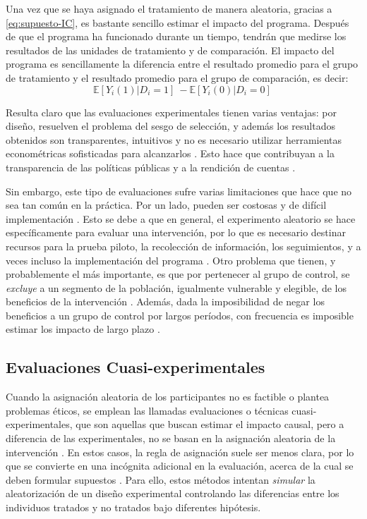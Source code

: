 \documentclass[../../main.tex]{subfiles}
\begin{document}
Una vez que se haya asignado el tratamiento de manera aleatoria, gracias a
\ref{eq:supuesto-IC}, es bastante sencillo estimar el impacto del programa. Después de que
el programa ha funcionado durante un tiempo, tendrán que medirse los resultados de las
unidades de tratamiento y de comparación. El impacto del programa es sencillamente la
diferencia entre el resultado promedio para el grupo de tratamiento y el resultado
promedio para el grupo de comparación, es decir:
\[
\mathbb{E} \left[Y_i(1)|D_i=1\right]\ - \mathbb{E} \left[Y_i(0)|D_i=0\right]\
\]

Resulta claro que las evaluaciones experimentales tienen varias ventajas: por diseño,
resuelven el problema del sesgo de selección, y además los resultados obtenidos son
transparentes, intuitivos y no es necesario utilizar herramientas econométricas
sofisticadas para alcanzarlos \cite{bernal}. Esto hace que contribuyan a la transparencia
de las políticas públicas y a la rendición de cuentas \cite{bernal}.

Sin embargo, este tipo de evaluaciones sufre varias limitaciones que hace que no sea tan
común en la práctica. Por un lado, pueden ser costosas y de difícil implementación
\cite{bernal}. Esto se debe a que en general, el experimento aleatorio se hace
específicamente para evaluar una intervención, por lo que es necesario destinar recursos
para la prueba piloto, la recolección de información, los seguimientos, y a veces incluso
la implementación del programa \cite{bernal}. Otro problema que tienen, y probablemente el
más importante, es que por pertenecer al grupo de control, se \textit{excluye} a un
segmento de la población, igualmente vulnerable y elegible, de los beneficios de la
intervención \cite{bernal}. Además, dada la imposibilidad de negar los beneficios a un
grupo de control por largos períodos, con frecuencia es imposible estimar los impacto de
largo plazo \cite{bernal}.

\subsection{Evaluaciones Cuasi-experimentales}
Cuando la asignación aleatoria de los participantes no es factible o plantea problemas
éticos, se emplean las llamadas evaluaciones o técnicas cuasi-experimentales, que son
aquellas que buscan estimar el impacto causal, pero a diferencia de las experimentales, no
se basan en la asignación aleatoria de la intervención \cite{gertler-2016}. En estos
casos, la regla de asignación suele ser menos clara, por lo que se convierte en una
incógnita adicional en la evaluación, acerca de la cual se deben formular supuestos
\cite{gertler-2016}. Para ello, estos métodos intentan \textit{simular} la aleatorización
de un diseño experimental controlando las diferencias entre los individuos tratados y no
tratados bajo diferentes hipótesis.
\end{document}
